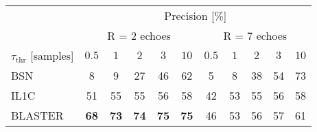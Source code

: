 {
    \centering
    \scriptsize
    \begin{tabular}{lccccc|ccccc}
    \toprule
            & \multicolumn{10}{c}{Precision [\%]}	\\
            \cline{2-11}
            & \multicolumn{5}{c|}{R = 2 echoes} & \multicolumn{5}{c}{R = 7 echoes} \\
            \hline
$\tau_\text{thr}$ [samples] & $0.5$ & $1$ & $2$ & $3$ & $10$ & $0.5$ & $1$ & $2$ & $3$ & $10$ \\ \hline
BSN &  8 &           9 &          27 &          46 &           62 &           5 &           8 &          38 &          54 &  {73}  \\
IL1C &           51 &          55 &          55 &          56 &           58 &          42 &          53 &          55 &          56 &         58 \\
BLASTER & \textbf{68}  & \textbf{73}  & \textbf{74}  & \textbf{75}  & \textbf{75}   &{46}  &          53 &  {56}& {57} &         61 \\
\bottomrule
\end{tabular}
}

